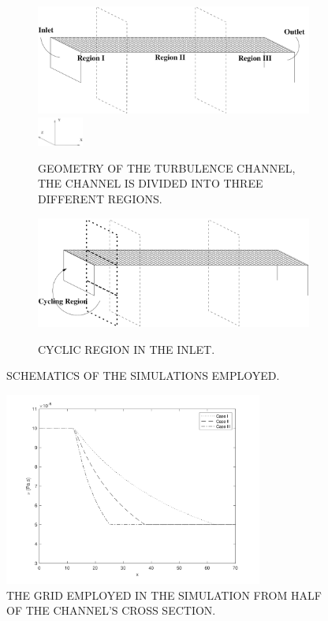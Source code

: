 \documentclass[twocolumn,10pt]{asme2e}
\begin{document}
\begin{figure}[!htbp]
	\centering
	\begin{subfigure}{0.4\textwidth} %
		\includegraphics[width=\textwidth]{turbchannel_a.png}
		\includegraphics[trim = 0mm 0mm 0mm 20mm, width = 15mm]{axis.png}
		\caption{GEOMETRY OF THE TURBULENCE CHANNEL, THE CHANNEL IS DIVIDED INTO THREE DIFFERENT REGIONS.} %
	\label{fig:geometries}
	\end{subfigure}

	\begin{subfigure}{0.4\textwidth} %
		\includegraphics[width=\textwidth]{turbchannel_b.png}
		\label{fig:cyclic_inlet}
		\caption{CYCLIC REGION IN THE INLET.} %
	\end{subfigure}
	\caption{SCHEMATICS OF THE SIMULATIONS EMPLOYED.} %
	\label{fig:models}
\end{figure}

\begin{figure}[!htbp]
\begin{center}
\setlength{\unitlength}{0.012500in}%
  \includegraphics[trim = 20mm 15mm 30mm 10mm, width = 85mm]{viscosity.png}
\end{center}
  \caption{THE GRID EMPLOYED IN THE SIMULATION FROM HALF OF THE CHANNEL'S CROSS SECTION.}
  \label{fig:viscosity_cases}
\end{figure}
\end{document}
